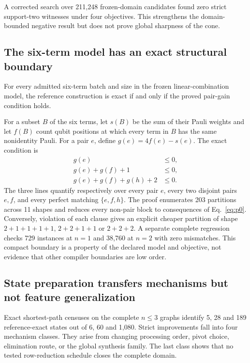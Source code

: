 A corrected search over 211,248 frozen-domain candidates found zero strict support-two witnesses under four objectives.  This strengthens the domain-bounded negative result but does not prove global sharpness of the cone.

\subsection{The six-term model has an exact structural boundary}

\begin{theorem}
For every admitted six-term batch and size in the frozen linear-combination model, the reference construction is exact if and only if the proved pair-gain condition holds.
\end{theorem}

For a subset $B$ of the six terms, let $s(B)$ be the sum of their Pauli weights and let $f(B)$ count qubit positions at which every term in $B$ has the same nonidentity Pauli.  For a pair $e$, define $g(e)=4f(e)-s(e)$.  The exact condition is
\begin{align}
g(e)&\leq0,\nonumber\\
g(e)+g(f)+1&\leq0,\label{eq:p0}\\
g(e)+g(f)+g(h)+2&\leq0.\nonumber
\end{align}
The three lines quantify respectively over every pair $e$, every two disjoint pairs $e,f$, and every perfect matching $\{e,f,h\}$.
The proof enumerates 203 partitions across 11 shapes and reduces every non-pair block to consequences of Eq.~\eqref{eq:p0}.  Conversely, violation of each clause gives an explicit cheaper partition of shape $2+1+1+1+1$, $2+2+1+1$ or $2+2+2$.  A separate complete regression checks 729 instances at $n=1$ and 38,760 at $n=2$ with zero mismatches.  This compact boundary is a property of the declared model and objective, not evidence that other compiler boundaries are low order.

\subsection{State preparation transfers mechanisms but not feature generalization}

Exact shortest-path censuses on the complete $n\leq3$ graphs identify 5, 28 and 189 reference-exact states out of 6, 60 and 1,080.  Strict improvements fall into four mechanism classes.  They arise from changing processing order, pivot choice, elimination route, or the global synthesis family.  The last class shows that no tested row-reduction schedule closes the complete domain.

